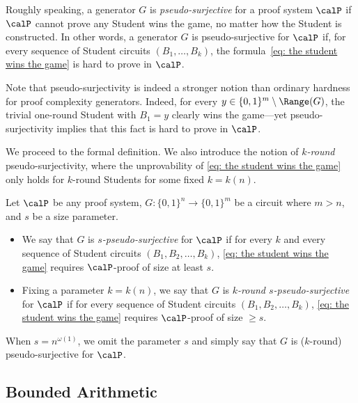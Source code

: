 Roughly speaking, a generator $G$ is \emph{pseudo-surjective} for a proof system $\calP$ if $\calP$ cannot prove any Student wins the game, no matter how the Student is constructed. In other words, a generator $G$ is pseudo-surjective for $\calP$ if, for every sequence of Student circuits $(B_1, \dots, B_k)$, the formula~\eqref{eq: the student wins the game} is hard to prove in $\calP$.

Note that pseudo-surjectivity is indeed a stronger notion than ordinary hardness for proof complexity generators. Indeed, for every $y \in \{0, 1\}^m \setminus \Range(G)$, the trivial one-round Student with $B_1 = y$ clearly wins the game---yet pseudo-surjectivity implies that this fact is hard to prove in $\calP$.


We proceed to the formal definition. We also introduce the notion of \emph{$k$-round} pseudo-surjectivity, where the unprovability of \eqref{eq: the student wins the game} only holds for $k$-round Students for some fixed $k = k(n)$.

\begin{definition}\label{def:pseudo-surjectivity}
    Let $\calP$ be any proof system, $G: \{0, 1\}^n \to \{0, 1\}^m$ be a circuit where $m > n$, and $s$ be a size parameter.\begin{itemize}
        \item We say that $G$ is \emph{$s$-pseudo-surjective} for $\calP$ if for every $k$ and every sequence of Student circuits $(B_1, B_2, \dots, B_k)$, \eqref{eq: the student wins the game} requires $\calP$-proof of size at least $s$.
        \item Fixing a parameter $k = k(n)$, we say that $G$ is \emph{$k$-round $s$-pseudo-surjective} for $\calP$ if for every sequence of Student circuits $(B_1, B_2, \dots, B_k)$, \eqref{eq: the student wins the game} requires $\calP$-proof of size $\ge s$.
    \end{itemize}
    
    When $s = n^{\omega(1)}$, we omit the parameter $s$ and simply say that $G$ is ($k$-round) pseudo-surjective for $\calP$.
\end{definition}

\subsection{Bounded Arithmetic}\label{sec: bounded arithmetic prelim}

